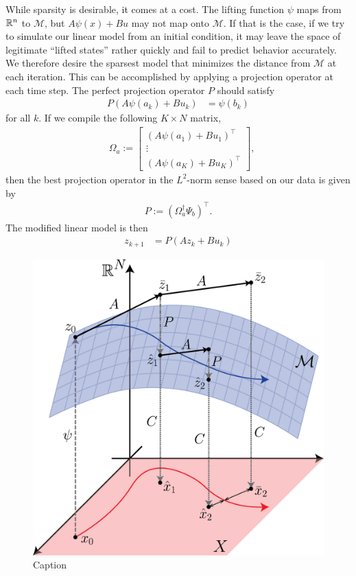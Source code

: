 While sparsity is desirable, it comes at a cost.
The lifting function $\psi$ maps from $\mathbb{R}^n$ to $\mathcal{M}$, but $A\psi(x) + B u$ may not map onto $\mathcal{M}$.
If that is the case, if we try to simulate our linear model from an initial condition, it may leave the space of legitimate ``lifted states'' rather quickly and fail to predict behavior accurately.
We therefore desire the sparsest model that minimizes the distance from $\mathcal{M}$ at each iteration.
This can be accomplished by applying a projection operator at each time step.
The perfect projection operator $P$ should satisfy
\begin{align}
    P \left( A {\psi}(a_k) + B u_k \right) &= \psi(b_k)
\end{align}
for all $k$. 
If we compile the following $K \times N$ matrix,
\begin{align}
    &\Omega_a := \begin{bmatrix} \left( A {\psi}(a_1) + B u_1 \right)^\top \\ \vdots \\  \left( A {\psi}(a_K) + B u_K \right)^\top \end{bmatrix},
    \label{eq:Omega}
\end{align}
then the best projection operator in the $L^2$-norm sense based on our data is given by
\begin{align}
    P := \left( \Omega_{a}^\dagger \Psi_b \right)^\top.
\end{align}
The modified linear model is then 
\begin{align}
    z_{k+1} &= P \left( A z_k + B u_k \right)
    \label{eq:linSys_wP}
\end{align}


\begin{figure}
    \centering
    \includegraphics[width=0.9\linewidth]{figures/liftingManifold_v13_ph.png}
    \caption{Caption}
    \label{fig:manifold}
\end{figure}